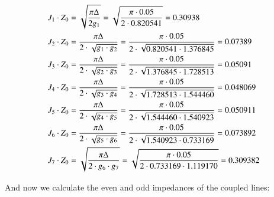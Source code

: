 \documentclass[12pt]{report} %
\begin{document}
\begin{align*}
J_1 \cdot Z_0 &= \sqrt{\frac{\pi \* \Delta}{2 \* g_1}} = \sqrt{\frac{\pi \cdot 0.05}{2 \cdot 0.820541}} = 0.30938 \\
J_2 \cdot Z_0 &= \frac{\pi \* \Delta}{2 \cdot \sqrt{g_1 \cdot g_2}} = \frac{\pi \cdot 0.05}{2 \cdot \sqrt{0.820541 \cdot 1.376845}} = 0.07389 \\
J_3 \cdot Z_0 &= \frac{\pi \* \Delta}{2 \cdot \sqrt{g_2 \cdot g_3}} = \frac{\pi \cdot 0.05}{2 \cdot \sqrt{1.376845 \cdot 1.728513}} = 0.05091 \\
J_4 \cdot Z_0 &= \frac{\pi \* \Delta}{2 \cdot \sqrt{g_3 \cdot g_4}} = \frac{\pi \cdot 0.05}{2 \cdot \sqrt{1.728513 \cdot 1.544460}} = 0.048069 \\
J_5 \cdot Z_0 &= \frac{\pi \* \Delta}{2 \cdot \sqrt{g_4 \cdot g_5}} = \frac{\pi \cdot 0.05}{2 \cdot \sqrt{1.544460 \cdot 1.540923}} = 0.050911 \\
J_6 \cdot Z_0 &= \frac{\pi \* \Delta}{2 \cdot \sqrt{g_5 \cdot g_6}} = \frac{\pi \cdot 0.05}{2 \cdot \sqrt{1.540923 \cdot 0.733169}} = 0.073892 \\
J_7 \cdot Z_0 &= \sqrt{\frac{\pi \* \Delta}{2 \cdot g_6 \cdot g_7}} = \sqrt{\frac{\pi \cdot 0.05}{2 \cdot 0.733169 \cdot 1.119170}} = 0.309382 \\
\end{align*}

And now we calculate the even and odd impedances of the coupled lines:
\end{document}
